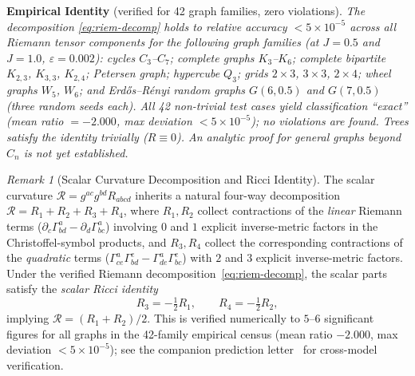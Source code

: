 \documentclass[11pt]{article}
\theoremstyle{definition}
\theoremstyle{remark}
\newtheorem{remark}[theorem]{Remark}
\newcommand{\Ric}{R}
\newcommand{\Scal}{\mathcal{R}}
\begin{document}
\noindent\textbf{Empirical Identity} (verified for 42 graph families, zero violations).
\textit{The decomposition \eqref{eq:riem-decomp} holds to relative accuracy
$< 5 \times 10^{-5}$ across all Riemann tensor components for the following
graph families (at $J = 0.5$ and $J = 1.0$, $\varepsilon = 0.002$):
cycles $C_3$--$C_7$; complete graphs $K_3$--$K_6$;
complete bipartite $K_{2,3}$, $K_{3,3}$, $K_{2,4}$;
Petersen graph; hypercube $Q_3$; grids $2{\times}3$, $3{\times}3$, $2{\times}4$;
wheel graphs $W_5$, $W_6$; and Erd\H{o}s--R\'enyi random graphs
$G(6, 0.5)$ and $G(7, 0.5)$ (three random seeds each).
All 42 non-trivial test cases yield classification ``exact''
(mean ratio $= -2.000$, max deviation $< 5{\times}10^{-5}$);
no violations are found.
Trees satisfy the identity trivially ($\Ric \equiv 0$).
An analytic proof for general graphs beyond $C_n$ is not yet established.}

\begin{remark}[Scalar Curvature Decomposition and Ricci Identity]
\label{rem:scalar-ricci}
The scalar curvature $\Scal = g^{ac}g^{bd}R_{abcd}$ inherits a natural
four-way decomposition $\Scal = R_1 + R_2 + R_3 + R_4$, where $R_1, R_2$
collect contractions of the \emph{linear} Riemann terms
($\partial_c\Gamma^a_{bd} - \partial_d\Gamma^a_{bc}$) involving $0$ and $1$
explicit inverse-metric factors in the Christoffel-symbol products,
and $R_3, R_4$ collect the corresponding contractions of the \emph{quadratic}
terms ($\Gamma^a_{ce}\Gamma^e_{bd} - \Gamma^a_{de}\Gamma^e_{bc}$) with
$2$ and $3$ explicit inverse-metric factors.
Under the verified Riemann decomposition~\eqref{eq:riem-decomp}, the scalar
parts satisfy the \emph{scalar Ricci identity}
\begin{equation}
  R_3 = -\tfrac{1}{2}R_1, \qquad R_4 = -\tfrac{1}{2}R_2,
  \label{eq:scalar-ricci-id}
\end{equation}
implying $\Scal = (R_1 + R_2)/2$.
This is verified numerically to $5$--$6$ significant figures for all graphs
in the 42-family empirical census (mean ratio $-2.000$, max deviation
$< 5\times10^{-5}$); see the companion prediction
letter~\cite{PredLetter} for cross-model verification.
\end{remark}
\end{document}
